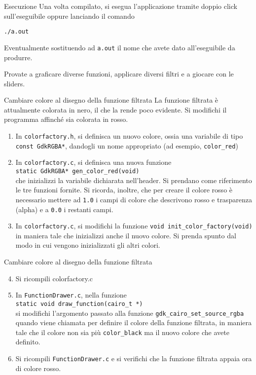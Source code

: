 \documentclass{beamer}
\begin{document}
\begin{frame}[fragile]{Esecuzione}
Una volta compilato, si esegua l'applicazione tramite doppio click sull'eseguibile oppure lanciando il comando
\begin{verbatim}
./a.out
\end{verbatim}
Eventualmente sostituendo ad \texttt{a.out} il nome che avete dato all'eseguibile da produrre.

Provate a graficare diverse funzioni, applicare diversi filtri e a giocare con le sliders.
\end{frame}

\begin{frame}[fragile]{Cambiare colore al disegno della funzione filtrata}
La funzione filtrata è attualmente colorata in nero, il che la rende poco evidente. Si modifichi il programma affinché sia colorata in rosso.
\begin{enumerate}
 \item In \texttt{colorfactory.h}, si definisca un nuovo colore, ossia una variabile di tipo \texttt{const GdkRGBA*}, dandogli un nome appropriato (ad esempio, \texttt{color\_red})
 \item In \texttt{colorfactory.c}, si definisca una nuova funzione \\ \texttt{static GdkRGBA* gen\_color\_red(void)} \\ che inizializzi la variabile dichiarata nell'header. Si prendano come riferimento le tre funzioni fornite. Si ricorda, inoltre, che per creare il colore rosso è necessario mettere ad \texttt{1.0} i campi di colore che descrivono rosso e trasparenza (alpha) e a \texttt{0.0} i restanti campi.
 \item In \texttt{colorfactory.c}, si modifichi la funzione \texttt{void init\_color\_factory(void)} in maniera tale che inizializzi anche il nuovo colore. Si prenda spunto dal modo in cui vengono inizializzati gli altri colori.
\end{enumerate}
\end{frame}

\begin{frame}[fragile]{Cambiare colore al disegno della funzione filtrata}
\begin{enumerate}
\setcounter{enumi}{3}
 \item Si ricompili colorfactory.c
 \item In \texttt{FunctionDrawer.c}, nella funzione \\ \texttt{static void draw\_function(cairo\_t *)}\\ si modifichi l'argomento passato alla funzione \texttt{gdk\_cairo\_set\_source\_rgba} quando viene chiamata per definire il colore della funzione filtrata, in maniera tale che il colore non sia più \texttt{color\_black} ma il nuovo colore che avete definito.
 \item Si ricompili \texttt{FunctionDrawer.c} e si verifichi che la funzione filtrata appaia ora di colore rosso.
\end{enumerate}
\end{frame}
\end{document}
